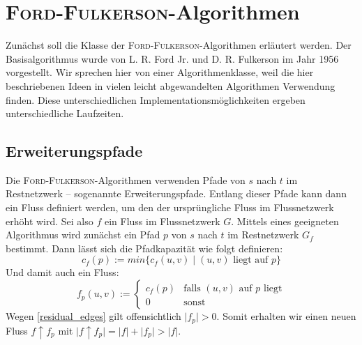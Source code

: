 \documentclass[12pt,a4paper,titlepage,onecolumn,ngerman,bibliography=totocnumbered]{scrartcl}
\theoremstyle{definition}
\theoremstyle{remark}
\newcommand{\ff}{\textsc{Ford-Fulkerson}}
\begin{document}
\section{\ff -Algorithmen}
Zunächst soll die Klasse der \ff -Algorithmen erläutert werden.
Der Basisalgorithmus wurde von L. R. Ford Jr. und D. R. Fulkerson im Jahr 1956 vorgestellt.
Wir sprechen hier von einer Algorithmenklasse, weil die hier beschriebenen Ideen in vielen leicht abgewandelten Algorithmen Verwendung finden.
Diese unterschiedlichen Implementationsmöglichkeiten ergeben unterschiedliche Laufzeiten.

\subsection{Erweiterungspfade}
Die \ff -Algorithmen verwenden Pfade von $s$ nach $t$ im Restnetzwerk -- sogenannte Erweiterungspfade.
Entlang dieser Pfade kann dann ein Fluss definiert werden, um den der ursprüngliche Fluss im Flussnetzwerk erhöht wird.
\medbreak
Sei also $f$ ein Fluss im Flussnetzwerk $G$.
Mittels eines geeigneten Algorithmus wird zunächst ein Pfad $p$ von $s$ nach $t$ im Restnetzwerk $G_f$ bestimmt.
Dann lässt sich die Pfadkapazität wie folgt definieren:
\begin{equation}
	c_f(p) := min\{ c_f(u,v)\mid (u,v) \text{ liegt auf $p$}\}
\end{equation}
\medbreak
Und damit auch ein Fluss:
\begin{equation}
	f_p(u,v) := \begin{cases}c_f(p) & \text{falls $(u,v)$ auf $p$ liegt}\\0 & \text{sonst}\end{cases}
\end{equation}
\medbreak
Wegen \eqref{residual_edges} gilt offensichtlich $\lvert f_p\rvert > 0$.
Somit erhalten wir einen neuen Fluss $f\uparrow f_p$ mit $\lvert f\uparrow f_p \rvert = \lvert f \rvert + \lvert f_p\rvert > \lvert f\rvert$. %
\end{document}
